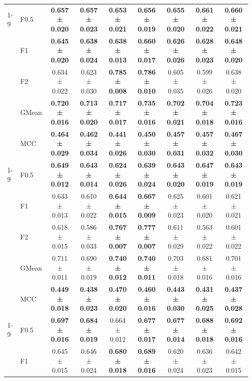 \begin{table}[H]
{\begin{tabular}{llccccccc}
\cline{1-9}
\multirow[t]{5}{*}{GaussianNB} & F0.5 & \textbf{0.657 ± 0.020} & \textbf{0.657 ± 0.023} & \textbf{0.653 ± 0.021} & \textbf{0.656 ± 0.019} & \textbf{0.655 ± 0.020} & \textbf{0.661 ± 0.022} & \textbf{0.660 ± 0.021} \\
 & F1 & \textbf{0.645 ± 0.020} & \textbf{0.638 ± 0.024} & \textbf{0.638 ± 0.013} & \textbf{0.660 ± 0.017} & \textbf{0.626 ± 0.026} & \textbf{0.628 ± 0.023} & \textbf{0.648 ± 0.020} \\
 & F2 & 0.634 ± 0.022 & 0.623 ± 0.030 & \textbf{0.785 ± 0.008} & \textbf{0.786 ± 0.010} & 0.605 ± 0.035 & 0.599 ± 0.026 & 0.638 ± 0.020 \\
 & GMean & \textbf{0.720 ± 0.016} & \textbf{0.713 ± 0.020} & \textbf{0.717 ± 0.017} & \textbf{0.735 ± 0.016} & \textbf{0.702 ± 0.021} & \textbf{0.704 ± 0.018} & \textbf{0.723 ± 0.016} \\
 & MCC & \textbf{0.464 ± 0.029} & \textbf{0.462 ± 0.034} & \textbf{0.441 ± 0.026} & \textbf{0.450 ± 0.030} & \textbf{0.457 ± 0.031} & \textbf{0.457 ± 0.032} & \textbf{0.467 ± 0.030} \\
\cline{1-9}
\multirow[t]{5}{*}{LGBM()} & F0.5 & \textbf{0.649 ± 0.012} & \textbf{0.643 ± 0.014} & \textbf{0.624 ± 0.026} & \textbf{0.639 ± 0.024} & \textbf{0.643 ± 0.020} & \textbf{0.647 ± 0.019} & \textbf{0.643 ± 0.019} \\
 & F1 & 0.633 ± 0.013 & 0.610 ± 0.022 & \textbf{0.644 ± 0.015} & \textbf{0.667 ± 0.009} & 0.625 ± 0.023 & 0.601 ± 0.020 & 0.621 ± 0.021 \\
 & F2 & 0.618 ± 0.015 & 0.586 ± 0.033 & \textbf{0.767 ± 0.007} & \textbf{0.777 ± 0.007} & 0.611 ± 0.029 & 0.563 ± 0.022 & 0.601 ± 0.022 \\
 & GMean & 0.711 ± 0.011 & 0.690 ± 0.019 & \textbf{0.740 ± 0.012} & \textbf{0.740 ± 0.011} & 0.703 ± 0.018 & 0.681 ± 0.016 & 0.701 ± 0.016 \\
 & MCC & \textbf{0.449 ± 0.018} & \textbf{0.438 ± 0.023} & \textbf{0.470 ± 0.020} & \textbf{0.460 ± 0.016} & \textbf{0.443 ± 0.030} & \textbf{0.431 ± 0.025} & \textbf{0.437 ± 0.028} \\
\cline{1-9}
\multirow[t]{5}{*}{LogisticRegression()} & F0.5 & \textbf{0.697 ± 0.016} & \textbf{0.684 ± 0.019} & 0.664 ± 0.012 & \textbf{0.677 ± 0.017} & \textbf{0.677 ± 0.014} & \textbf{0.688 ± 0.018} & \textbf{0.692 ± 0.016} \\
 & F1 & 0.645 ± 0.015 & 0.646 ± 0.024 & \textbf{0.680 ± 0.018} & \textbf{0.689 ± 0.016} & 0.620 ± 0.024 & 0.636 ± 0.023 & 0.642 ± 0.015 \\

\end{tabular}}
\end{table}
